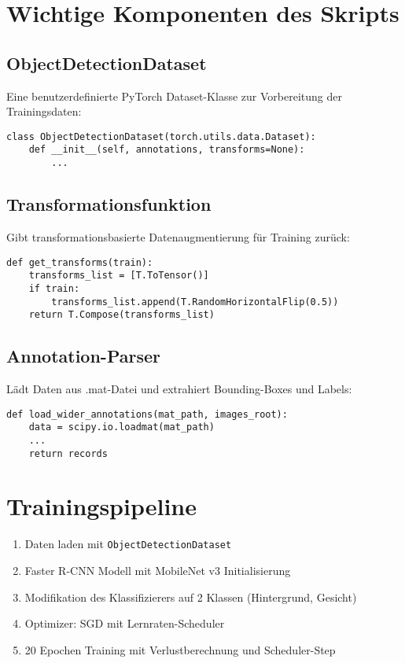\documentclass[11pt,a4paper]{article}
\begin{document}
\section{Wichtige Komponenten des Skripts}

\subsection{ObjectDetectionDataset}
Eine benutzerdefinierte PyTorch Dataset-Klasse zur Vorbereitung der Trainingsdaten:

\begin{lstlisting}
class ObjectDetectionDataset(torch.utils.data.Dataset):
    def __init__(self, annotations, transforms=None):
        ...
\end{lstlisting}

\subsection{Transformationsfunktion}
Gibt transformationsbasierte Datenaugmentierung für Training zurück:

\begin{lstlisting}
def get_transforms(train):
    transforms_list = [T.ToTensor()]
    if train:
        transforms_list.append(T.RandomHorizontalFlip(0.5))
    return T.Compose(transforms_list)
\end{lstlisting}

\subsection{Annotation-Parser}
Lädt Daten aus .mat-Datei und extrahiert Bounding-Boxes und Labels:

\begin{lstlisting}
def load_wider_annotations(mat_path, images_root):
    data = scipy.io.loadmat(mat_path)
    ...
    return records
\end{lstlisting}

\section{Trainingspipeline}

\begin{enumerate}
    \item Daten laden mit \texttt{ObjectDetectionDataset}
    \item Faster R-CNN Modell mit MobileNet v3 Initialisierung
    \item Modifikation des Klassifizierers auf 2 Klassen (Hintergrund, Gesicht)
    \item Optimizer: SGD mit Lernraten-Scheduler
    \item 20 Epochen Training mit Verlustberechnung und Scheduler-Step
\end{enumerate}
\end{document}
